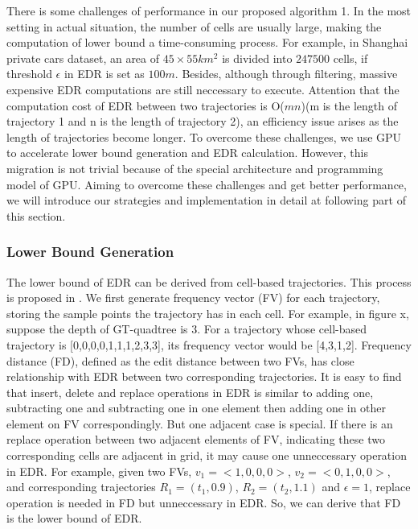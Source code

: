 \documentclass[conference]{IEEEtran}
\begin{document}
There is some challenges of performance in our proposed algorithm 1. In the most setting in actual situation, the number of cells are usually large, making the computation of lower bound a time-consuming process. For example, in Shanghai private cars dataset, an area of $45\times 55 km^{2}$ is divided into $247500$ cells, if threshold $\epsilon$ in EDR is set as $100m$. Besides, although through filtering, massive expensive EDR computations are still neccessary to execute. Attention that the computation cost of EDR between two trajectories is O($mn$)(m is the length of trajectory 1 and n is the length of trajectory 2), an efficiency issue arises as the length of trajectories become longer. To overcome these challenges, we use GPU to accelerate lower bound generation and EDR calculation. However, this migration is not trivial because of the special architecture and programming model of GPU. Aiming to overcome these challenges and get better performance, we will introduce our strategies and implementation in detail at following part of this section.

\subsubsection{Lower Bound Generation}
The lower bound of EDR can be derived from cell-based trajectories. This process is proposed in \cite{DBLP:conf/sigmod/ChenOO05}. We first generate frequency vector (FV) for each trajectory, storing the sample points the trajectory has in each cell. For example, in figure x, suppose the depth of GT-quadtree is 3. For a trajectory whose cell-based trajectory is [0,0,0,0,1,1,1,2,3,3], its frequency vector would be [4,3,1,2]. Frequency distance (FD), defined as the edit distance between two FVs, has close relationship with EDR between two corresponding trajectories. It is easy to find that insert, delete and replace operations in EDR is similar to adding one, subtracting one and subtracting one in one element then adding one in other element on FV correspondingly. But one adjacent case is special. If there is an replace operation between two adjacent elements of FV, indicating these two corresponding cells are adjacent in grid, it may cause one unneccessary operation in EDR. For example, given two FVs, $v_{1}=<1,0,0,0>$, $v_{2}=<0,1,0,0>$, and corresponding trajectories $R_{1}=(t_{1},0.9)$, $R_{2}=(t_{2},1.1)$ and $\epsilon =1$, replace operation is needed in FD but unneccessary in EDR. So, we can derive that FD is the lower bound of EDR.
\end{document}
